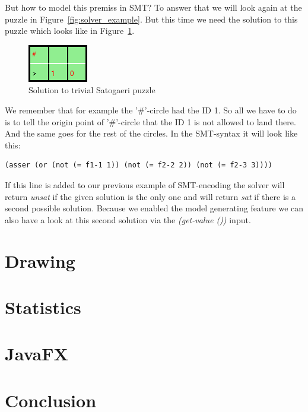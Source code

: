 \documentclass[a4paper,10pt]{paper}
\begin{document}
But how to model this premiss in SMT? To answer that we will look again at the puzzle in Figure~\ref{fig:solver_example}. But this time we need the solution to this puzzle which looks like in Figure~\ref{fig:solver_example_solution}.
\begin{figure}
  \centering
  \includegraphics[scale=1]{Pictures/solver_example_solution.png} 
  \caption{Solution to trivial Satogaeri puzzle}
  \label{fig:solver_example_solution}
\end{figure}
We remember that for example the '\#'-circle had the ID 1. So all we have to do is to tell the origin point of '\#'-circle that the ID 1 is not allowed to land there. And the same goes for the rest of the circles. In the SMT-syntax it will look like this:
\begin{lstlisting}
(asser (or (not (= f1-1 1)) (not (= f2-2 2)) (not (= f2-3 3))))
\end{lstlisting}
If this line is added to our previous example of SMT-encoding the solver will return \emph{unsat} if the given solution is the only one and will return \emph{sat} if there is a second possible solution. Because we enabled the model generating feature we can also have a look at this second solution via the \emph{(get-value ())} input.

\section{Drawing}

\section{Statistics}

\section{JavaFX}

\section{Conclusion}
\end{document}
